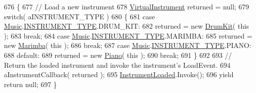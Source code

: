 \begin{DoxyCode}
676     \{
677         \textcolor{comment}{// Load a new instrument}
678         \hyperlink{class_virtual_instrument}{VirtualInstrument} returned = null;
679         \textcolor{keywordflow}{switch}( aINSTRUMENT\_TYPE )
680         \{
681             \textcolor{keywordflow}{case} \hyperlink{class_music}{Music}.\hyperlink{group___music_enums_gabfce60192305965558a36e368ebd67c3}{INSTRUMENT\_TYPE}.DRUM\_KIT:
682                 returned = \textcolor{keyword}{new} \hyperlink{class_drum_kit}{DrumKit}( \textcolor{keyword}{this} );
683                 \textcolor{keywordflow}{break};
684             \textcolor{keywordflow}{case} \hyperlink{class_music}{Music}.\hyperlink{group___music_enums_gabfce60192305965558a36e368ebd67c3}{INSTRUMENT\_TYPE}.MARIMBA:
685                 returned = \textcolor{keyword}{new} \hyperlink{class_marimba}{Marimba}( \textcolor{keyword}{this} );
686                 \textcolor{keywordflow}{break};
687             \textcolor{keywordflow}{case} \hyperlink{class_music}{Music}.\hyperlink{group___music_enums_gabfce60192305965558a36e368ebd67c3}{INSTRUMENT\_TYPE}.PIANO:
688             \textcolor{keywordflow}{default}:
689                 returned = \textcolor{keyword}{new} \hyperlink{class_piano}{Piano}( \textcolor{keyword}{this} );
690                 \textcolor{keywordflow}{break};
691         \}
692 
693         \textcolor{comment}{// Return the loaded instrument and invoke the instrument's LoadEvent.}
694         aInstrumentCallback( returned );
695         \hyperlink{group___v_i_m_events_gad79b789b020d7e4a8c149ec653c0b97f}{InstrumentLoaded}.Invoke();
696         yield \textcolor{keywordflow}{return} null;
697     \}
\end{DoxyCode}

